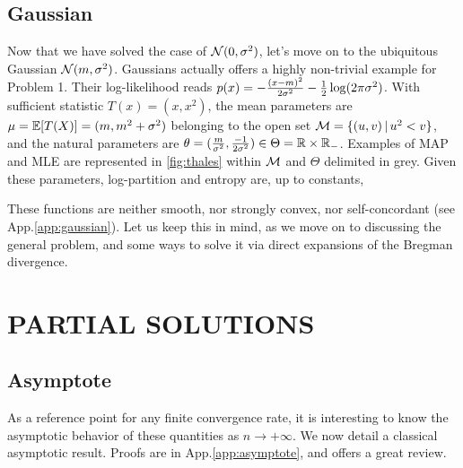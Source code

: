 \documentclass[twoside]{article}
\let\oldsection\section
\renewcommand{\section}[1]{\oldsection{\texorpdfstring{\uppercase{#1}}{#1}}}
\newcommand{\cond}{\,\vert\,}
\newcommand{\logpart}{A}
\newcommand{\conj}{\logpart^*}
\newcommand{\nat}{\theta}
\newcommand{\m}{\mu}
\begin{document}
\subsection{Gaussian}
\label{ssec:gaussian}
Now that we have solved the case of ${\mathcal N}(0,\sigma^2)$, let's move on to the ubiquitous Gaussian ${\mathcal N}(m,\sigma^2)$.
Gaussians actually offers a highly non-trivial example for Problem 1.
Their log-likelihood reads $p(x) = -\frac{(x-m)^2}{2 \sigma^2} - \frac{1}{2} \log(2\pi\sigma^2)$.
With sufficient statistic $T(x)=(x, x^2)$,
the mean parameters are $\m = \E[T(X)] = (m , m^2 + \sigma^2)$ belonging to the open set $\cM= \{(u,v) \cond u^2 < v\}$,
and the natural parameters are $\nat= (\frac{m}{\sigma^2} , \frac{-1}{2\sigma^2}) \in \Theta = \real \times \real_-$.
Examples of MAP and MLE  are represented in \cref{fig:thales} within ${\mathcal M}$ and $\Theta$ delimited in grey.
Given these parameters, log-partition and entropy are, up to constants,
\alignn{
	\logpart(\nat) &= \frac{\nat_1^2}{-4\nat_2} - \half \log(-2\nat_2) \\
	\conj(\m) &= - \half \log (\mu_2 - \mu_1^2)
}

These functions are neither smooth, nor strongly convex, nor self-concordant (see App.\ref{app:gaussian}).
Let us keep this in mind, as we move on to discussing the general problem, and some ways to solve it via direct expansions of the Bregman divergence.

\section{Partial Solutions}
\label{sec:insights}

\subsection{Asymptote}
\label{ssec:asymptote}
As a reference point for any finite convergence rate, it is interesting to know the asymptotic behavior of these quantities as $n \rightarrow +\infty$.
We now detail a classical asymptotic result.
Proofs are in App.\ref{app:asymptote}, and \citet[\S1.1]{ostrovskii2021finite} offers a great review.
\end{document}
